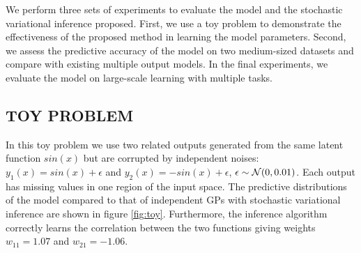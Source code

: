 We perform three sets of experiments to evaluate the model and the stochastic variational inference proposed. 
First, we use a toy problem to demonstrate the effectiveness of the proposed method in learning the model parameters.
Second, we assess the predictive accuracy of the model on two medium-sized datasets and compare with existing multiple output models.
In the final experiments, we evaluate the model on large-scale learning with multiple tasks.

\subsection{TOY PROBLEM}
In this toy problem we use two related outputs generated from the same latent function $sin(x)$ but are corrupted by independent noises: $y_1(x) = sin(x) + \epsilon$ and $y_2(x) = -sin(x) + \epsilon$, $\epsilon \sim \mathcal{N}(0,0.01)$.
Each output has missing values in one region of the input space.
The predictive distributions of the model compared to that of independent GPs with stochastic variational inference are shown in figure \ref{fig:toy}.
Furthermore, the inference algorithm correctly learns the correlation between the two functions giving weights $w_{11} = 1.07$ and $w_{21} = -1.06$.

